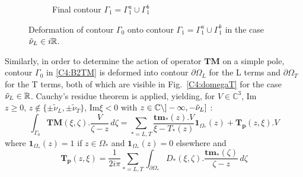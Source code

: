 \begin{figure}
\begin{subfigure}[b]{0.45\textwidth}
\caption{Final contour $\Gamma_1=\Gamma_1^a \cup \Gamma_1^b$}
\end{subfigure}
\caption{Deformation of contour $\Gamma_0$ onto contour $\Gamma_1=\Gamma_1^a \cup \Gamma_1^b$ in the case $\tilde{\nu}_L \in i\mathbb{R}$.}
\label{C4:gamma1cr}
\end{figure}

Similarly, in order to determine the action of operator $\mathbf{TM}$ on a simple pole, contour $\Gamma_0$ in \eqref{C4:B2TM} is deformed into contour $\partial \Omega_L$ for the L terms and $\partial \Omega_T$ for the T terms, both of which are visible in Fig.~\ref{C4:domegaT} for the case $\tilde{\nu}_L \in \mathbb{R}$. Cauchy's residue theorem is applied, yielding, for $V \in \mathbb{C}^3$, Im$z\geq 0, \, z \notin \{\pm\tilde{\nu}_L,\pm\tilde{\nu}_T \}$, Im$\xi <0 $ with $z\in \mathbb{C} \backslash  \rbrack - \infty, -\tilde{\nu}_L \rbrack$ :
\begin{equation}
\int_{\Gamma_0} \textbf{TM}(\xi,\zeta).\frac{V}{\zeta-z}\,d\zeta = \sum_{*=L,T} \frac{\textbf{tm}_*(z).V}{\xi-T_*(z)}\textbf{1}_{\Omega_*}(z)+\mathbf{T_p}(z,\xi).V
\label{C4:GaussTM}
\end{equation}
where $\textbf{1}_{\Omega_*}(z)=1$ if $z\in \Omega_*$ and $\textbf{1}_{\Omega_*}(z)=0$ elsewhere and
\begin{equation}
\mathbf{T_p}(z,\xi)= \frac{1}{2i\pi} \sum_{*=L,T} \int_{\partial \Omega_*} D_*(\xi,\zeta) .\dfrac{\textbf{tm}_*(\zeta)}{\zeta-z}\, d\zeta
\label{C4:defTp}
\end{equation}

